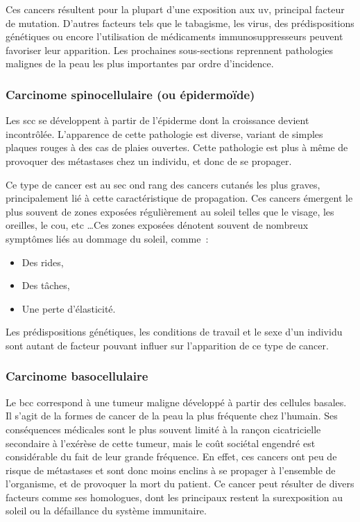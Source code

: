 Ces cancers résultent pour la plupart d’une exposition aux \gls{uv}, principal facteur de mutation. D’autres facteurs tels que le tabagisme, les virus, des prédispositions génétiques ou encore l’utilisation de médicaments immunosuppresseurs peuvent favoriser leur apparition. Les prochaines sous-sections reprennent pathologies malignes de la peau les plus importantes par ordre d'incidence.\par

\subsubsection{Carcinome spinocellulaire (ou épidermoïde)}
Les \gls{scc} se développent à partir de l'épiderme dont la croissance devient incontrôlée. L’apparence de cette pathologie est diverse, variant de simples plaques rouges à des cas de plaies ouvertes. Cette pathologie est plus à même de provoquer des métastases chez un individu, et donc de se propager.\par

Ce type de cancer est au sec ond rang des cancers cutanés les plus graves, principalement lié à cette caractéristique de propagation. Ces cancers émergent le plus souvent de zones exposées régulièrement au soleil telles que le visage, les oreilles, le cou, etc \ldots Ces zones exposées dénotent souvent de nombreux symptômes liés au dommage du soleil, comme~:
\begin{itemize}
\item Des rides,
\item Des tâches,
\item Une perte d’élasticité.
\end{itemize}
Les prédispositions génétiques, les conditions de travail et le sexe d’un individu sont autant de facteur pouvant influer sur l’apparition de ce type de cancer.\par

\subsubsection{Carcinome basocellulaire}	
Le \gls{bcc} correspond à une tumeur maligne développé à partir des cellules basales. Il s’agit de la formes de cancer de la peau la plus fréquente chez l'humain. Ses conséquences médicales sont le plus souvent limité à la rançon cicatricielle secondaire à l'exérèse de cette tumeur, mais le coût sociétal engendré est considérable du fait de leur grande fréquence. En effet, ces cancers ont peu de risque de métastases et sont donc moins enclins à se propager à l’ensemble de l’organisme, et de provoquer la mort du patient. Ce cancer peut résulter de divers facteurs comme ses homologues, dont les principaux restent la surexposition au soleil ou la défaillance du système immunitaire.\par

